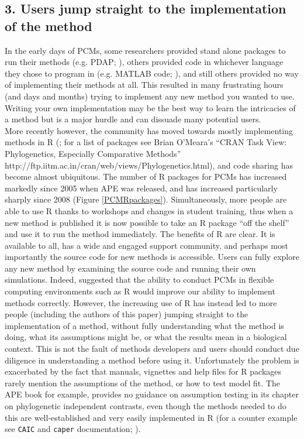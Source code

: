 \documentclass[a4paper,12pt]{article}
\begin{document}
  \subsection{3. Users jump straight to the implementation of the method}
    In the early days of PCMs, some researchers provided stand alone packages to run their methods (e.g. PDAP; \citealp{diaz1996testing}), others provided code in whichever language they chose to program in (e.g. MATLAB code; \citealp{rohlf2001comparative}), and still others provided no way of implementing their methods at all. 
    This resulted in many frustrating hours (and days and months) trying to implement any new method you wanted to use.
    Writing your own implementation may be the best way to learn the intricacies of a method but is a major hurdle and can dissuade many potential users.  \\

    More recently however, the community has moved towards mostly implementing methods in R (\citealp{R-Core-Team:2014aa}; for a list of packages see Brian O'Meara's ``CRAN Task View: Phylogenetics, Especially Comparative Methods'' http://ftp.iitm.ac.in/cran/web/views/Phylogenetics.html), and code sharing has become almost ubiquitous. 
    The number of R packages for PCMs has increased markedly since 2005 when APE \citep{Paradis:2004aa} was released, and has increased particularly sharply since 2008 (Figure \ref{PCMRpackages}).
    Simultaneously, more people are able to use R thanks to workshops and changes in student training, thus when a new method is published it is now possible to take an R package ``off the shelf'' and use it to run the method immediately.
    The benefits of R are clear. 
    It is available to all, has a wide and engaged support community, and perhaps most importantly the source code for new methods is accessible.
    Users can fully explore any new method by examining the source code and running their own simulations. 
    Indeed, \citet{freckleton2009seven} suggested that the ability to conduct PCMs in flexible computing environments such as R would improve our ability to implement methods correctly. 
    However, the increasing use of R has instead led to more people (including the authors of this paper) jumping straight to the implementation of a method, without fully understanding what the method is doing, what its assumptions might be, or what the results mean in a biological context.
    This is not the fault of methods developers and users should conduct due diligence in understanding a method before using it. 
    Unfortunately the problem is exacerbated by the fact that manuals, vignettes and help files for R packages rarely mention the assumptions of the method, or how to test model fit. 
    The APE book \citep[an excellent resource;][]{paradis2011analysis} for example, provides no guidance on assumption testing in its chapter on phylogenetic independent contrasts, even though the methods needed to do this are well-established and very easily implemented in R (for a counter example see \texttt{CAIC} and \texttt{caper} documentation; \citealp{purvis1995comparative,Orme:2013aa}).
\end{document}
